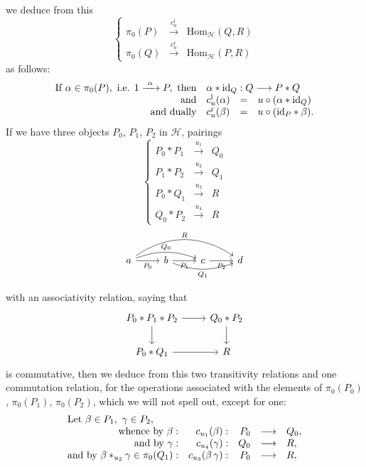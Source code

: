 
we deduce from this
\[
\left\{
\begin{array}{lcl}
\pi_0(P) & \xrightarrow{c_u^{\mathrm{l}}} & \mathrm{Hom}_{\mathcal{H}}(Q,R)\\
\pi_0(Q) & \xrightarrow{c_u^{\mathrm{r}}} & \mathrm{Hom}_{\mathcal{H}}(P,R)
\end{array}
\right.
\]
as follows:
\[
\begin{array}{rlcl}
\text{If } \alpha\in\pi_0(P),\ \text{i.e. } 1\xrightarrow{\ \alpha\ }P,\ \text{then} & \multicolumn{3}{l}{\alpha*\mathrm{id}_Q : Q\longrightarrow P*Q}\\
\text{and} & c^{\mathrm{l}}_u(\alpha) & = & u\circ(\alpha*\mathrm{id}_Q)\\
\text{and dually} & c^{\mathrm{r}}_u(\beta) & = & u\circ(\mathrm{id}_P*\beta).
\end{array}
\]
If we have three objects $P_0$, $P_1$, $P_2$ in $\mathcal{H}$, pairings
\[
\left\{
\begin{array}{rcl}
P_0*P_1 & \xrightarrow{u_1} & Q_0\\
P_1*P_2 & \xrightarrow{u_2} & Q_1\\
P_0*Q_1 & \xrightarrow{u_3} & R\\
Q_0*P_2 & \xrightarrow{u_4} & R
\end{array}
\right.
\]
\[
\begin{tikzcd}
a \arrow[r, "P_0"'] \arrow[rr, bend left=20, "Q_0"] \arrow[rrr, bend left=35, "R"] & b \arrow[r, "P_1"'] \arrow[rr, bend right=20, "Q_1"'] & c \arrow[r, "P_2"'] & d
\end{tikzcd}
\]

with an associativity relation, saying that
\[
\begin{tikzcd}
P_0*P_1*P_2 \arrow[r] \arrow[d] & Q_0*P_2 \arrow[d]\\
P_0*Q_1 \arrow[r] & R
\end{tikzcd}
\]
is commutative, then we deduce from this two transitivity relations and one commutation relation, for the operations associated with the elements of $\pi_0(P_0)$, $\pi_0(P_1)$, $\pi_0(P_2)$, which we will not spell out, except for one:
\[
\begin{array}{rrrcl}
\multicolumn{5}{l}{\text{Let } \beta\in P_1,\ \gamma\in P_2,}\\
\text{whence by } \beta : & c_{u_1}(\beta) : & P_0 & \longrightarrow & Q_0,\\
\text{and by } \gamma : & c_{u_4}(\gamma) : & Q_0 & \longrightarrow & R,\\
\text{and by } \beta *_{u_2}\gamma\in\pi_0(Q_1) : & c_{u_3}(\beta\,\gamma) : & P_0 & \longrightarrow & R,
\end{array}
\]

